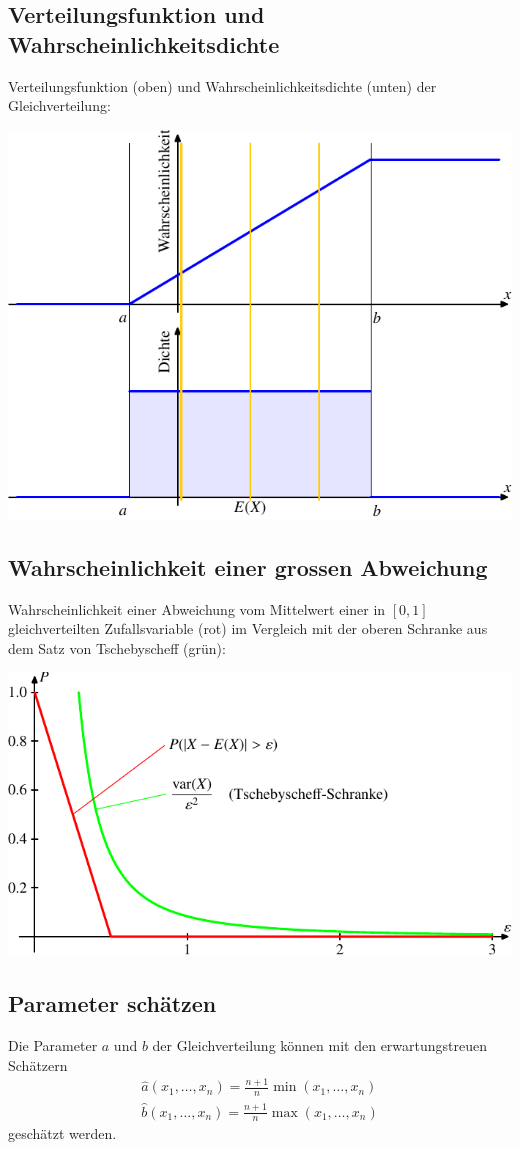 \subsection{Verteilungsfunktion und Wahrscheinlichkeitsdichte}
Verteilungsfunktion (oben) und Wahrscheinlichkeitsdichte (unten)
der Gleichverteilung:
\begin{center}
\includegraphics[width=0.8\hsize]{images/verteilungsfunktion-7}
\end{center}

\subsection{Wahrscheinlichkeit einer grossen Abweichung}
Wahrscheinlichkeit einer Abweichung vom Mittelwert einer
in $[0,1]$ gleichverteilten Zufallsvariable (rot) im Vergleich mit
der oberen Schranke aus dem Satz von Tschebyscheff (grün):
\begin{center}
\includegraphics{images/gl-1.pdf}
\end{center}

\subsection{Parameter schätzen}
Die Parameter $a$ und $b$ der Gleichverteilung können mit den 
erwartungstreuen Schätzern
\begin{align*}
\hat a(x_1,\dots,x_n)=\frac{n+1}{n}\min(x_1,\dots,x_n)\\
\hat b(x_1,\dots,x_n)=\frac{n+1}{n}\max(x_1,\dots,x_n)
\end{align*}
geschätzt werden.
